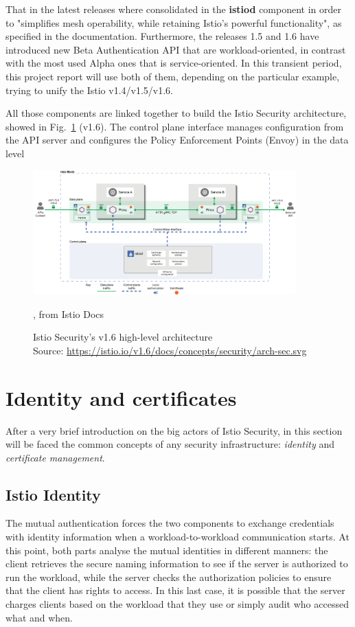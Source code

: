 That in the latest releases where consolidated in the \textbf{istiod} component in order to "simplifies mesh operability, while retaining Istio’s powerful functionality", as specified in the documentation. Furthermore, the releases 1.5 and 1.6 have introduced new Beta Authentication API that are workload-oriented, in contrast with the most used Alpha ones that is service-oriented. In this transient period, this project report will use both of them, depending on the particular example, trying to unify the Istio v1.4/v1.5/v1.6.

All those components are linked together to build the Istio Security architecture, showed in Fig.~\ref{fig:hlarch} (v1.6). The control plane interface manages configuration from the API server and configures the Policy Enforcement Points (Envoy) in the data level

\begin{figure}
    \centering
    \includegraphics[width=0.9\textwidth]{chapters/images/chp1/arch-sec.png}
    \caption{, from Istio Docs}
    \caption[Istio Security's v1.6 high-level architecture]{Istio Security's v1.6 high-level architecture\\Source: \url{https://istio.io/v1.6/docs/concepts/security/arch-sec.svg}}
    \label{fig:hlarch}
\end{figure}

\section{Identity and certificates}
After a very brief introduction on the big actors of Istio Security, in this section will be faced the common concepts of any security infrastructure: \textit{identity} and \textit{certificate management}.

\subsection{Istio Identity}
The mutual authentication forces the two components to exchange credentials with identity information when a workload-to-workload communication starts. At this point, both parts analyse the mutual identities in different manners: the client retrieves the secure naming information to see if the server is authorized to run the workload, while the server checks the authorization policies to ensure that the client has rights to access. 
In this last case, it is possible that the server charges clients based on the workload that they use or simply audit who accessed what and when.

